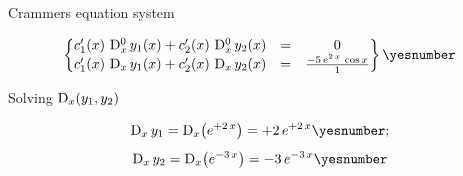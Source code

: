 \documentclass["AM3C-tests_resolutions.tex"]{subfiles}
\begin{document}
\begin{questionBox}
  Crammers equation system
  \begin{tcolorbox}
    \begin{gather*}
      \begin{Bmatrix}
        {
            c_1'(x)\,\mdif[0]{x}\,y_1(x) 
          + c_2'(x)\,\mdif[0]{x}\,y_2(x)
        } &=& 0
        \\ {
            c_1'(x)\,\mdif[1]{x}\,y_1(x) 
          + c_2'(x)\,\mdif[1]{x}\,y_2(x)
        } &=& \frac{-5\,e^{2\,x}\,\cos{x}}{1}
      \end{Bmatrix}
      \yesnumber\label{eq:q.2.2 eq_sytem}
    \end{gather*}
  \end{tcolorbox}

  Solving \(\mdif[1]{x}{(y_1,y_2)}\)
  \begin{tcolorbox}
    \begin{gather*}
      \mdif[1]{x}\,y_1
      = \mdif[1]{x}{\left(
          e^{+2\,x}
      \right)}
      = + 2\,e^{+2\,x}
      \yesnumber\label{eq:q.2.2 D_x(y_1)}
      ; \\[1ex]
      \mdif[1]{x}\,y_2
      = \mdif[1]{x}{\left(
          e^{-3\,x}
      \right)}
      = -3\,e^{-3\,x}
      \yesnumber\label{eq:q.2.2 D_x(y_2)}
    \end{gather*}
  \end{tcolorbox}

\end{questionBox}

\group{} %

\setcounter{question}{1}
\end{document}
